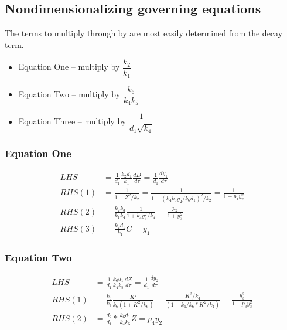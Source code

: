 \documentclass[10pt,letterpaper]{article}
\begin{document}
\subsection{Nondimensionalizing governing equations}

The terms to multiply through by are most easily determined from the decay term.

\begin{itemize}
  \item Equation One -- multiply by $\dfrac{k_2}{k_1}$
  \item Equation Two -- multiply by $\dfrac{k_6}{k_4 k_5}$
  \item Equation Three -- multiply by $\dfrac{1}{d_1 \sqrt{k_4}}$
\end{itemize}

\subsubsection{Equation One}
\begin{equation}
\begin{aligned}
LHS &= \frac{1}{d_1} \frac{k_2 d_1}{k_1} \frac{dD}{d\tau} = \frac{1}{d_1} \frac{dy_1}{d\tau} \\
RHS(1) &= \frac{1}{1 + Z^2/k_2} = \frac{1}{1 + (k_4 k_5 y_2 / k_6 d_1)^2/k_2} = \frac{1}{1 + p_1 y_2^2} \\
RHS(2) &= \frac{k_2 k_3}{k_1 k_4} \frac{1}{1 + k_4 y_3^2/k_4} = \frac{p_2}{1 + y_3^2}  \\
RHS(3) &= \frac{k_2 d_1}{k_1} C = y_1
\end{aligned}
\end{equation}

\subsubsection{Equation Two}
\begin{equation}
\begin{aligned}
LHS &= \frac{1}{d_1} \frac{k_6 d_1}{k_4 k_5} \frac{dZ}{d\tau} = \frac{1}{d_1} \frac{dy_2}{d\tau} \\
RHS(1) &= \frac{k_6}{k_4} \frac{K^2}{k_6(1 + K^2/k_6)} = \frac{K^2/k_4}{(1 + k_4/k_6*K^2/k_4)} = \frac{y_3^2}{1 + p_3 y_3^2} \\
RHS(2) &= \frac{d_2}{d_1} * \frac{k_6 d_1}{k_4 k_5} Z = p_4 y_2
\end{aligned}
\end{equation}
\end{document}

